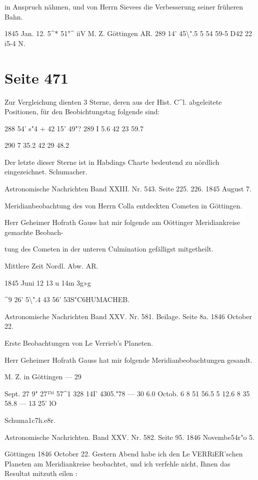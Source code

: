 \documentclass[10pt,a4paper]{article}
\begin{document}
in Anspruch nähmen, und von Herrn Sievees die Verbesserung seiner früheren Bahn.

1845 Jan. 12. 5\textasciicircum{}* 51"\textasciicircum{} iiV M. Z. Göttingen AR. 289\textdegree{} 14' 45\textbackslash{}".5 5 54 59-5 D42 22 i5-4 N.


\newpage
\section*{Seite 471}
Zur Vergleichung dienten 3 Sterne, deren aus der Hist. C\textasciicircum{}l. abgeleitete Positionen, für den Beobichtungstag folgende sind:

288\textdegree{} 54' s"4 + 42\textdegree{} 15' 49"? 289 I 5.6 42 23 59.7

290 7 35.2 42 29 48.2

Der letzte dieser Sterne ist in Habdings Charte bedeutend zu nördlich eingezeichnet. Schumacher.

Astronomische Nachrichten Band XXIII. Nr. 543. Seite 225. 226. 1845 August 7.

Meridianbeobachtung des von Herrn Colla entdeckten Cometen in Göttingen.

Herr Geheimer Hofrath Gauss hat mir folgende am Oöttinger Meridiankreise gemachte Beobach-

tung des Cometen in der unteren Culmination gefälligst mitgetheilt.

Mittlere Zeit Nordl. Abw. AR.

1845 Juni 12 13 u 14m 3g»g

\textasciicircum{}9\textdegree{} 26' 5\textbackslash{}".4 43\textdegree{} 56' 53S"C6HUMACHEB.

Astronomische Nachrichten Band XXV. Nr. 581. Beilage. Seite 8a. 1846 October 22.

Erste Beobachtungen von Le Verrieb's Planeten.

Herr Geheimer Hofrath Gauss hat mir folgende Meridianbeobachtungen gesandt.

M. Z. in Göttingen — 29

Sept. 27 9" 27™ 57\textasciicircum{}1 328\textdegree{} 14I' 4305."78 — 30 6.0 Octob. 6 8 51 56.5 5 12.6 8 35 58.8 — 13\textdegree{} 25' lO

Schuma1c7h.e8r.

Astronomische Nachrichten. Band XXV. Nr. 582. Seite 95. 1846 Novembe54r"o 5.

Göttingen 1846 October 22. Gestern Abend habe ich den Le VERRiER'schen Planeten am Meridiankreise beobachtet, und ich verfehle nicht, Ihnen das Resultat mitzuth eilen :
\end{document}
